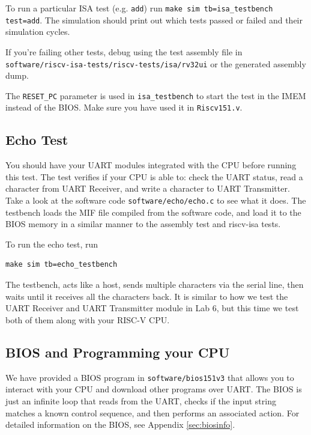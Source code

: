 \documentclass[11pt]{article}
\begin{document}
To run a particular ISA test (e.g. \verb|add|) run \verb|make sim tb=isa_testbench test=add|. The simulation should print out which tests passed or failed and their simulation cycles.


If you're failing other tests, debug using the test assembly file in\\\verb|software/riscv-isa-tests/riscv-tests/isa/rv32ui| or the generated assembly dump.

The \verb|RESET_PC| parameter is used in \verb|isa_testbench| to start the test in the IMEM instead of the BIOS.
Make sure you have used it in \verb|Riscv151.v|.

\subsection{Echo Test}

You should have your UART modules integrated with the CPU before running this test. The test verifies if your CPU is able to: check the UART status, read a character from UART Receiver, and write a character to UART Transmitter. Take a look at the software code \verb|software/echo/echo.c| to see what it does. The testbench loads the MIF file compiled from the software code, and load it to the BIOS memory in a similar manner to the assembly test and riscv-isa tests.

To run the echo test, run

\begin{verbatim}
make sim tb=echo_testbench
\end{verbatim}

The testbench, acts like a host, sends multiple characters via the serial line, then waits until it receives all the characters back. It is similar to how we test the UART Receiver and UART Transmitter module in Lab 6, but this time we test both of them along with your RISC-V CPU.

\subsection{BIOS and Programming your CPU}
\label{bios_info}

We have provided a BIOS program in \verb|software/bios151v3| that allows you to interact with your CPU and download other programs over UART.
The BIOS is just an infinite loop that reads from the UART, checks if the input string matches a known control sequence, and then performs an associated action.
For detailed information on the BIOS, see Appendix \ref{sec:biosinfo}.
\end{document}
